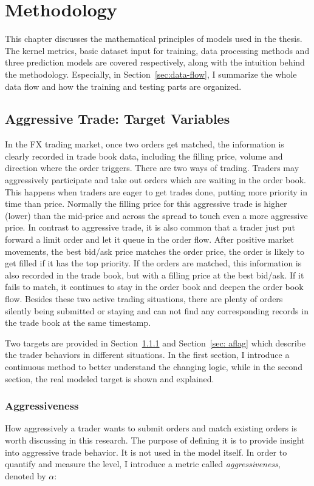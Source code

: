 \chapter{Methodology}\label{chapter:methodology}
This chapter discusses the mathematical principles of models used in the thesis. The kernel metrics, basic dataset input for training, data processing methods and three prediction models are covered respectively, along with the intuition behind the methodology. Especially, in Section~\ref{sec:data-flow}, I summarize the whole data flow and how the training and testing parts are organized. 

\section{Aggressive Trade: Target Variables}
In the FX trading market, once two orders get matched, the information is clearly recorded in trade book data, including the filling price, volume and direction where the order triggers. There are two ways of trading. Traders may aggressively participate and take out orders which are waiting in the order book. This happens when traders are eager to get trades done, putting more priority in time than price. Normally the filling price for this aggressive trade is higher (lower) than the mid-price and across the spread to touch even a more aggressive price. In contrast to aggressive trade, it is also common that a trader just put forward a limit order and let it queue in the order flow. After positive market movements, the best bid/ask price matches the order price, the order is likely to get filled if it has the top priority. If the orders are matched, this information is also recorded in the trade book, but with a filling price at the best bid/ask. If it fails to match, it continues to stay in the order book and deepen the order book flow. Besides these two active trading situations, there are plenty of orders silently being submitted or staying and can not find any corresponding records in the trade book at the same timestamp. 

Two targets are provided in Section~\ref{sec: alpha} and Section~\ref{sec: aflag} which describe the trader behaviors in different situations. In the first section, I introduce a continuous method to better understand the changing logic, while in the second section, the real modeled target is shown and explained.

\subsection{Aggressiveness} \label{sec: alpha}
How aggressively a trader wants to submit orders and match existing orders is worth discussing in this research. The purpose of defining it is to provide insight into aggressive trade behavior. It is not used in the model itself. In order to quantify and measure the level, I introduce a metric called \textit{aggressiveness}, denoted by $\alpha$:

